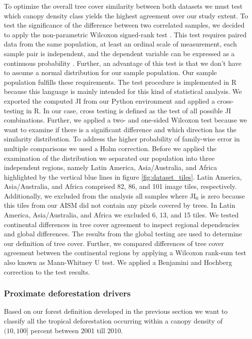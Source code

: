 			To optimize the overall tree cover similarity between both datasets we must test which canopy density class yields the highest agreement over our study extent. To test the significance of the difference between two correlated samples, we decided to apply the non-parametric Wilcoxon signed-rank test \citep{Wilcoxon1945}. This test requires paired data from the same population, at least an ordinal scale of measurement, each sample pair is independent, and the dependent variable can be expressed as a continuous probability \citep{Lowry2019}. Further, an advantage of this test is that we don't have to assume a normal distribution for our sample population. Our sample population fulfills these requirements.  The test procedure is implemented in R because this language is mainly intended for this kind of statistical analysis. We exported the computed \ac{JI} from our Python environment and applied a cross-testing in R. In our case, cross testing is defined as the test of all possible \ac{JI} combinations. Further, we applied a two- and one-sided Wilcoxon test because we want to examine if there is a significant difference and which direction has the similarity distribution. To address the higher probability of family-wise error in multiple comparisons we used a Holm correction. Before we applied the examination of the distribution we separated our population into three independent regions, namely Latin America, Asia/Australia, and Africa highlighted by the vertical blue lines in figure \ref{fig:dataset_tiles}. Latin America, Asia/Australia, and Africa comprised 82, 86, and 101 image tiles, respectively. Additionally, we excluded from the analysis all samples where JI$_0$ is zero because this tiles from our \ac{AISM} did not contain any pixels covered by trees. In Latin America, Asia/Australia, and Africa we excluded 6, 13, and 15 tiles. We tested continental differences in tree cover agreement to inspect regional dependencies and global differences. The results from the global testing are used to determine our definition of tree cover. Further, we compared differences of tree cover agreement between the continental regions by applying a Wilcoxon rank-sum test also known as Mann-Whitney U test. We applied a Benjamini and Hochberg correction to the test results.
 
		\subsubsection{Proximate deforestation drivers}
		\label{subsubsec:methods_proximate_deforestation_driver}
			Based on our forest definition developed in the previous section we want to classify all the tropical deforestation occurring within a canopy density of $(10,100]$ percent between 2001 till 2010. 

